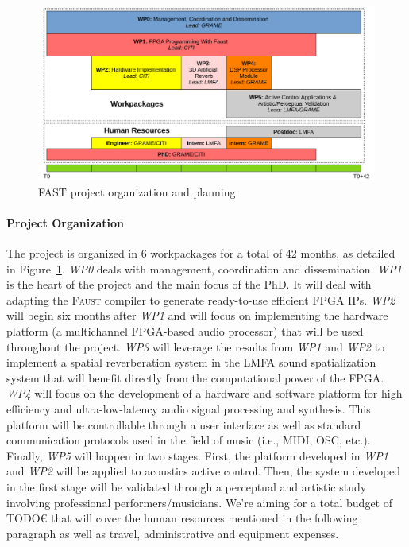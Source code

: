\documentclass[a4paper,10pt]{article}
\newcommand{\F}{\textsc{Faust}}
\newcommand{\PP}{FAST}
\begin{document}
\begin{figure}[h]
  \centering
  \includegraphics[width=\columnwidth]{img/wp}
  \caption{\PP{} project organization and planning.}
  \label{fig:wp}
\end{figure}

\paragraph{Project Organization}

The project is organized in 6 workpackages for a total of 42 months, as detailed in Figure~\ref{fig:wp}. \textit{WP0} deals with management, coordination and dissemination. \textit{WP1} is the heart of the project and the main focus of the PhD. It will deal with adapting the \F{} compiler to generate ready-to-use efficient FPGA IPs. \textit{WP2} will begin six months after \textit{WP1} and will focus on implementing the hardware platform (a multichannel FPGA-based audio processor) that will be used throughout the project. \textit{WP3} will leverage the results from \textit{WP1} and \textit{WP2} to implement a spatial reverberation system in the LMFA sound spatialization system that will benefit directly from the computational power of the FPGA. \textit{WP4} will focus on the development of a hardware and software platform for high efficiency and ultra-low-latency audio signal processing and synthesis. This platform will be controllable through a user interface as well as standard communication protocols used in the field of music (i.e., MIDI, OSC, etc.).
Finally, \textit{WP5} will happen in two stages. First, the platform developed in \textit{WP1} and \textit{WP2} will be applied to acoustics active control. Then, the system developed in the first stage will be validated through a perceptual and artistic study involving professional performers/musicians. We're aiming for a total budget of TODO\euro{} that will cover the human resources mentioned in the following paragraph as well as travel, administrative and equipment expenses.
\end{document}
